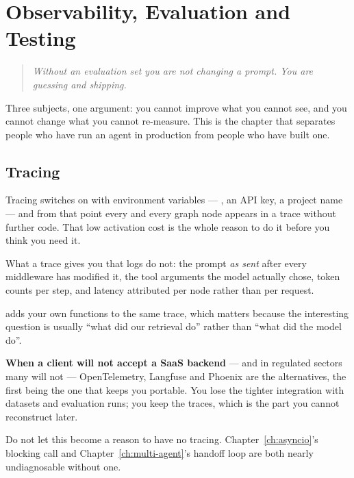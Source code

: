 \chapter{Observability, Evaluation and Testing}
\label{ch:observability}

\begin{quote}\itshape
Without an evaluation set you are not changing a prompt. You are guessing and
shipping.
\end{quote}

\noindent
Three subjects, one argument: you cannot improve what you cannot see, and you
cannot change what you cannot re-measure. This is the chapter that separates
people who have run an agent in production from people who have built one.

\section{Tracing}
\label{sec:tracing}

Tracing switches on with environment variables --- ,
an API key, a project name --- and from that point every  and every
graph node appears in a trace without further code. That low activation cost is
the whole reason to do it before you think you need it.

What a trace gives you that logs do not: the prompt \emph{as sent} after every
middleware has modified it, the tool arguments the model actually chose, token
counts per step, and latency attributed per node rather than per request.

 adds your own functions to the same trace, which matters
because the interesting question is usually ``what did our retrieval do'' rather
than ``what did the model do''.

\begin{note}
\textbf{When a client will not accept a SaaS backend} --- and in regulated
sectors many will not --- OpenTelemetry, Langfuse and Phoenix are the
alternatives, the first being the one that keeps you portable. You lose the
tighter integration with datasets and evaluation runs; you keep the traces, which
is the part you cannot reconstruct later.

Do not let this become a reason to have no tracing. Chapter~\ref{ch:asyncio}'s
blocking call and Chapter~\ref{ch:multi-agent}'s handoff loop are both nearly
undiagnosable without one.
\end{note}

